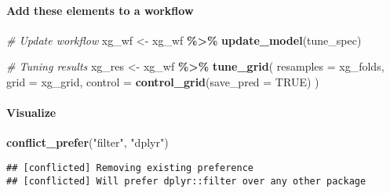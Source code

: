 \documentclass[
]{book}
\newenvironment{Shaded}{\begin{snugshade}}{\end{snugshade}}
\newcommand{\CommentTok}[1]{\textcolor[rgb]{0.56,0.35,0.01}{\textit{#1}}}
\newcommand{\DataTypeTok}[1]{\textcolor[rgb]{0.13,0.29,0.53}{#1}}
\newcommand{\KeywordTok}[1]{\textcolor[rgb]{0.13,0.29,0.53}{\textbf{#1}}}
\newcommand{\NormalTok}[1]{#1}
\newcommand{\OperatorTok}[1]{\textcolor[rgb]{0.81,0.36,0.00}{\textbf{#1}}}
\newcommand{\OtherTok}[1]{\textcolor[rgb]{0.56,0.35,0.01}{#1}}
\newcommand{\StringTok}[1]{\textcolor[rgb]{0.31,0.60,0.02}{#1}}
\begin{document}
\hypertarget{add-these-elements-to-a-workflow-3}{%
\paragraph{Add these elements to a workflow}\label{add-these-elements-to-a-workflow-3}}

\begin{Shaded}
\begin{Highlighting}[]
\CommentTok{\# Update workflow}
\NormalTok{xg\_wf \textless{}{-}}\StringTok{ }\NormalTok{xg\_wf }\OperatorTok{\%\textgreater{}\%}\StringTok{ }\KeywordTok{update\_model}\NormalTok{(tune\_spec)}

\CommentTok{\# Tuning results}
\NormalTok{xg\_res \textless{}{-}}\StringTok{ }\NormalTok{xg\_wf }\OperatorTok{\%\textgreater{}\%}
\StringTok{  }\KeywordTok{tune\_grid}\NormalTok{(}
    \DataTypeTok{resamples =}\NormalTok{ xg\_folds,}
    \DataTypeTok{grid =}\NormalTok{ xg\_grid,}
    \DataTypeTok{control =} \KeywordTok{control\_grid}\NormalTok{(}\DataTypeTok{save\_pred =} \OtherTok{TRUE}\NormalTok{)}
\NormalTok{  )}
\end{Highlighting}
\end{Shaded}

\hypertarget{visualize-3}{%
\paragraph{Visualize}\label{visualize-3}}

\begin{Shaded}
\begin{Highlighting}[]
\KeywordTok{conflict\_prefer}\NormalTok{(}\StringTok{"filter"}\NormalTok{, }\StringTok{"dplyr"}\NormalTok{)}
\end{Highlighting}
\end{Shaded}

\begin{verbatim}
## [conflicted] Removing existing preference
## [conflicted] Will prefer dplyr::filter over any other package
\end{verbatim}
\end{document}
